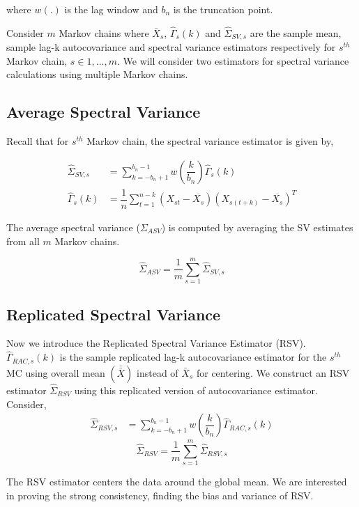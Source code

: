 \documentclass[12pt]{article}
\theoremstyle{remark}
\begin{document}
where $w(.)$ is the lag window and $b_n$ is the truncation point.

 Consider $m$ Markov chains where $\bar{X}_s$, $\hat{\Gamma}_s(k)$ and $\hat{\Sigma}_{SV, s}$ are the sample mean, sample lag-k autocovariance and spectral variance estimators respectively for $s^{th}$ Markov chain, $s\in {1,...,m}$. We will consider two estimators for spectral variance calculations using multiple Markov chains.

\subsection{Average Spectral Variance } \label{sec:asv}

Recall that for $s^{th}$ Markov chain, the spectral variance estimator is given by,

\begin{align*}
    \hat{\Sigma}_{SV,s} &= \sum_{k=-b_n+1}^{b_n-1}w\left(\dfrac{k}{b_n}\right)\hat{\Gamma}_s(k)\\
    \hat{\Gamma}_s(k) &= \dfrac{1}{n}\sum_{t=1}^{n-k}(X_{st}-\overline{X_s})(X_{s(t+k)}-\overline{X_s})^T
\end{align*}

The average spectral variance ($\Sigma_{ASV}$) is computed by averaging the SV estimates from all $m$ Markov chains.

\[
\hat{\Sigma}_{ASV} = \dfrac{1}{m}\sum_{s=1}^{m}\hat{\Sigma}_{SV,s}
\]

\subsection{Replicated Spectral Variance } \label{sec:rsv}

Now we introduce the Replicated Spectral Variance Estimator (RSV). $\hat{\Gamma}_{RAC,s}(k)$ is the sample replicated lag-k autocovariance estimator for the $s^{th}$ MC using overall mean $(\bar{\bar{X}})$ instead of $\bar{X}_s$ for centering. We construct an RSV estimator $\hat{\Sigma}_{RSV} $ using this replicated version of autocovariance estimator. Consider, 
%
\begin{align*}
    \hat{\Sigma}_{RSV,s} &= \sum_{k=-b_n+1}^{b_n-1}w\left(\dfrac{k}{b_n}\right)\hat{\Gamma}_{RAC,s}(k)
\end{align*}
\[
\hat{\Sigma}_{RSV} =  \dfrac{1}{m}\sum_{s=1}^{m}\hat{\Sigma}_{RSV,s}
\]

The RSV estimator centers the data around the global mean. We are interested in proving the strong consistency, finding the bias and variance of RSV. 
\end{document}
